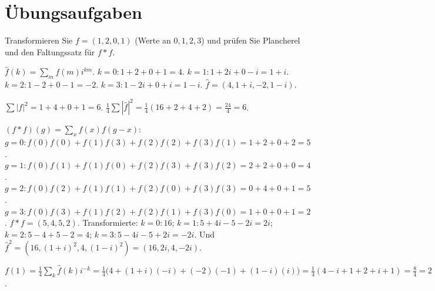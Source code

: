 \section{Übungsaufgaben}

\begin{aufgabe}
Transformieren Sie $f = (1, 2, 0, 1)$ (Werte an $0, 1, 2, 3$) und prüfen Sie Plancherel und den Faltungssatz für $f * f$.

\loesung
{}
$\hat f(k) = \sum_mf(m)i^{km}$. $k = 0\colon1 + 2 + 0 + 1 = 4$. $k = 1\colon1 + 2i + 0 - i = 1 + i$. $k = 2\colon1 - 2 + 0 - 1 = -2$. $k = 3\colon1 - 2i + 0 + i = 1 - i$. $\hat f = (4, 1 + i, -2, 1 - i)$.

$\sum|f|^{2} = 1 + 4 + 0 + 1 = 6$. $\frac14\sum|\hat f|^{2} = \frac14(16 + 2 + 4 + 2) = \frac{24}4 = 6$. \checkmark

$(f * f)(g) = \sum_xf(x)f(g - x)$: $g = 0\colon f(0)f(0) + f(1)f(3) + f(2)f(2) + f(3)f(1) = 1 + 2 + 0 + 2 = 5$. $g = 1\colon f(0)f(1) + f(1)f(0) + f(2)f(3) + f(3)f(2) = 2 + 2 + 0 + 0 = 4$. $g = 2\colon f(0)f(2) + f(1)f(1) + f(2)f(0) + f(3)f(3) = 0 + 4 + 0 + 1 = 5$. $g = 3\colon f(0)f(3) + f(1)f(2) + f(2)f(1) + f(3)f(0) = 1 + 0 + 0 + 1 = 2$. $f * f = (5, 4, 5, 2)$.
Transformierte: $k = 0\colon16$; $k = 1\colon5 + 4i - 5 - 2i = 2i$; $k = 2\colon5 - 4 + 5 - 2 = 4$; $k = 3\colon5 - 4i - 5 + 2i = -2i$. Und $\hat f^{2} = (16, (1 + i)^{2}, 4, (1 - i)^{2}) = (16, 2i, 4, -2i)$. \checkmark

$f(1) = \frac14\sum_k\hat f(k)i^{-k} = \frac14\bigl(4 + (1 + i)(-i) + (-2)(-1) + (1 - i)(i)\bigr) = \frac14(4 - i + 1 + 2 + i + 1) = \frac84 = 2$. \checkmark

\begin{center}
\begin{minipage}{0.88\textwidth}
\end{minipage}
\end{center}
\end{aufgabe}

